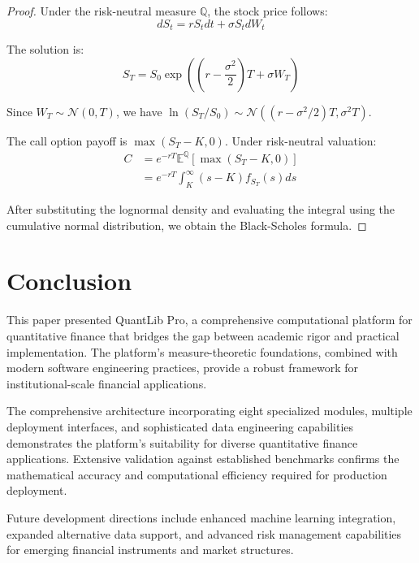 \documentclass[12pt,a4paper]{article}
\theoremstyle{definition}
\theoremstyle{remark}
\begin{document}
\begin{proof}
Under the risk-neutral measure $\mathbb{Q}$, the stock price follows:
\begin{equation}
dS_t = rS_t dt + \sigma S_t dW_t
\end{equation}

The solution is:
\begin{equation}
S_T = S_0 \exp\left((r - \frac{\sigma^2}{2})T + \sigma W_T\right)
\end{equation}

Since $W_T \sim \mathcal{N}(0, T)$, we have $\ln(S_T/S_0) \sim \mathcal{N}((r - \sigma^2/2)T, \sigma^2T)$.

The call option payoff is $\max(S_T - K, 0)$. Under risk-neutral valuation:
\begin{align}
C &= e^{-rT} \mathbb{E}^{\mathbb{Q}}[\max(S_T - K, 0)] \\
&= e^{-rT} \int_K^{\infty} (s - K) f_{S_T}(s) ds
\end{align}

After substituting the lognormal density and evaluating the integral using the cumulative normal distribution, we obtain the Black-Scholes formula.
\end{proof}

\FloatBarrier
\section{Conclusion}

This paper presented QuantLib Pro, a comprehensive computational platform for quantitative finance that bridges the gap between academic rigor and practical implementation. The platform's measure-theoretic foundations, combined with modern software engineering practices, provide a robust framework for institutional-scale financial applications.

The comprehensive architecture incorporating eight specialized modules, multiple deployment interfaces, and sophisticated data engineering capabilities demonstrates the platform's suitability for diverse quantitative finance applications. Extensive validation against established benchmarks confirms the mathematical accuracy and computational efficiency required for production deployment.

Future development directions include enhanced machine learning integration, expanded alternative data support, and advanced risk management capabilities for emerging financial instruments and market structures.
\end{document}
